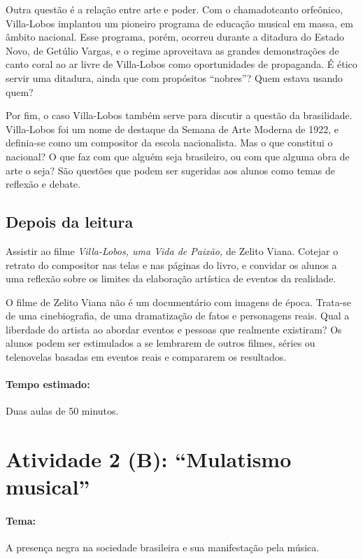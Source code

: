 \documentclass[11pt]{extarticle}
\begin{document}
Outra questão é a relação entre arte e poder. Com o chamadotcanto
orfeônico, Villa-Lobos implantou um pioneiro programa de educação
musical em massa, em âmbito nacional. Esse programa, porém, ocorreu
durante a ditadura do Estado Novo, de Getúlio Vargas, e o regime
aproveitava as grandes demonstrações de canto coral ao ar livre de
Villa-Lobos como oportunidades de propaganda. É ético servir uma
ditadura, ainda que com propósitos ``nobres''? Quem estava usando quem?

Por fim, o caso Villa-Lobos também serve para discutir a questão da
brasilidade. Villa-Lobos foi um nome de destaque da Semana de Arte
Moderna de 1922, e definia-se como um compositor da escola nacionalista.
Mas o que constitui o nacional? O que faz com que alguém seja
brasileiro, ou com que alguma obra de arte o seja? São questões que
podem ser sugeridas aos alunos como temas de reflexão e debate.

\subsection{Depois da leitura}

Assistir ao filme \emph{Villa-Lobos, uma Vida de Paixão,} de Zelito
Viana. Cotejar o retrato do compositor nas telas e nas páginas do livro,
e convidar os alunos a uma reflexão sobre os limites da elaboração
artística de eventos da realidade.

O filme de Zelito Viana não é um documentário com imagens de época.
Trata-se de uma cinebiografia, de uma dramatização de fatos e
personagens reais. Qual a liberdade do artista ao abordar eventos e
pessoas que realmente existiram? Os alunos podem ser estimulados a se
lembrarem de outros filmes, séries ou telenovelas basadas em eventos
reais e compararem os resultados.

\paragraph{Tempo estimado:} Duas aulas de 50 minutos.


\section{Atividade 2 (B): “Mulatismo musical”}

\paragraph{Tema:} A presença negra na sociedade brasileira e sua manifestação pela música.
\end{document}
